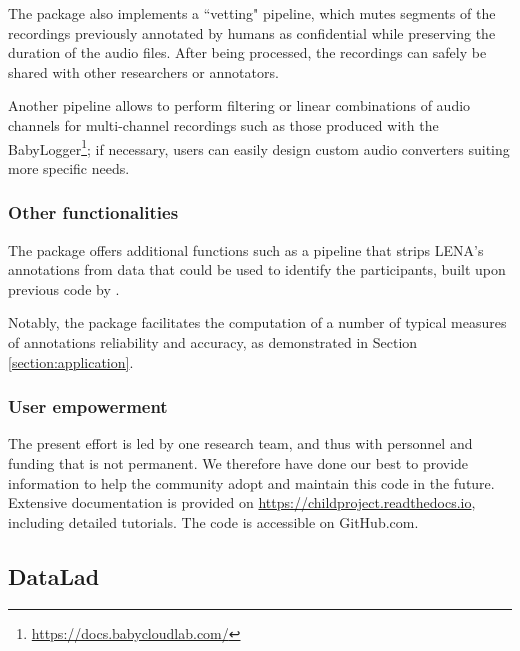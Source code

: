 \documentclass[smallextended]{svjour3}       %
\begin{document}
The package also implements a ``vetting" \citep{vandam2018vetting,Cychosz2020} pipeline, which mutes segments of the recordings previously annotated by humans as confidential while preserving the duration of the audio files. After being processed, the recordings can safely be shared with other researchers or annotators.

Another pipeline allows to perform filtering or linear combinations of audio channels for multi-channel recordings such as those produced with the BabyLogger\footnote{\url{https://docs.babycloudlab.com/}}; if necessary, users can easily design custom audio converters suiting more specific needs.

\subsubsection*{Other functionalities}

The package offers additional functions such as a pipeline that strips LENA's annotations from data that could be used to identify the participants, built upon previous code by \citet{eaf-anonymizer-original}.

Notably, the package facilitates the computation of a number of typical measures of annotations reliability and accuracy, as demonstrated in Section \ref{section:application}.

\subsubsection*{User empowerment}

The present effort is led by one research team, and thus with personnel and funding that is not permanent. We therefore have done our best to provide information to help the community adopt and maintain this code in the future. Extensive documentation is provided on \url{https://childproject.readthedocs.io}, including detailed tutorials. The code is accessible on GitHub.com.


\subsection{DataLad}\label{section:datalad}
\end{document}
